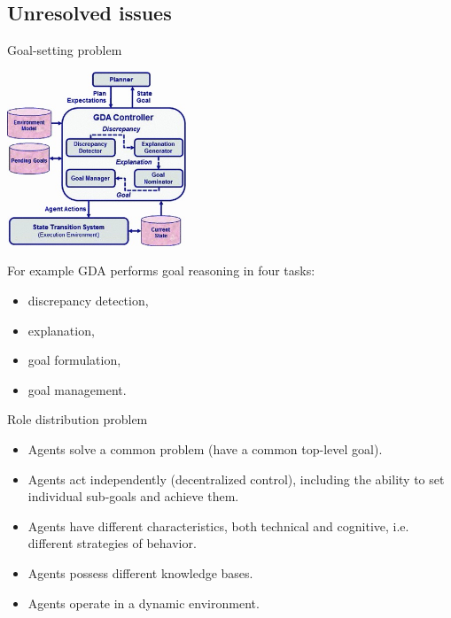 \documentclass[default]{beamer}
\begin{document}
	\subsection{Unresolved issues}
	\begin{frame}{Goal-setting problem}
		\begin{center}
			\includegraphics[width=0.4\textwidth]{misc/control/gda.jpg}
		\end{center}
		\scriptsize
		For example GDA performs goal reasoning in four tasks: 
		\begin{itemize}
			\item discrepancy detection,
			\item explanation, 
			\item goal formulation, 
			\item goal management.
		\end{itemize}
		
		\par\bigskip
		\nocite{*}
		\printbibliography[keyword={gda}, resetnumbers=true]
	\end{frame}
	\begin{frame}{Role distribution problem}
		\begin{itemize}
			\item Agents solve a common problem (have a common top-level goal).
			\item Agents act independently (decentralized control), including the ability to set individual sub-goals and achieve them.
			\item Agents have different characteristics, both technical and cognitive, i.e. different strategies of behavior.
			\item Agents possess different knowledge bases.
			\item Agents operate in a dynamic environment.
		\end{itemize}
		
		\par\bigskip
		\nocite{*}
		\printbibliography[keyword={roles}, resetnumbers=true]
	\end{frame}
\end{document}
